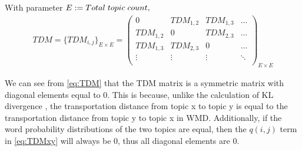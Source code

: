 \documentclass[UTF8]{ctexart}
\begin{document}
{    With parameter $E := Total \hspace{0.1cm} topic \hspace{0.1cm} count,$
    \begin{gather}
        TDM = \{TDM_{i, j}\}_{E \times E} =
        \left(
        \begin{array}{cccc}
                0          & TDM_{1, 2} & TDM_{1, 3} & \ldots \\
                TDM_{1, 2} & 0          & TDM_{2, 3} & \ldots \\
                TDM_{1, 3} & TDM_{2, 3} & 0          & \ldots \\
                \vdots     & \vdots     & \vdots     & \ddots \\
            \end{array}
        \right)_{E \times E} \label{eq:TDM}
    \end{gather}

    We can see from \eqref{eq:TDM} that the TDM matrix is a symmetric matrix with diagonal elements equal to 0. 
    This is because, unlike the calculation of KL divergence \cite{ref10}, 
    the transportation distance from topic x to topic y is equal to the transportation distance from topic y to topic x in WMD. 
    Additionally, if the word probability distributions of the two topics are equal, then the $q(i,j)$ term in \eqref{eq:TDMxy} will always be 0, 
    thus all diagonal elements are 0.
}
\end{document}
